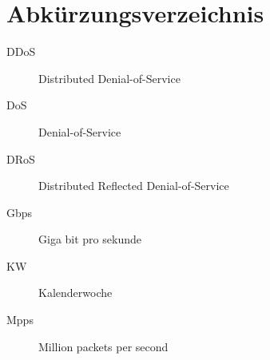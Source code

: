 \documentclass[../review_2.tex]{subfiles}
\begin{document}
\chapter{Abkürzungsverzeichnis}\thispagestyle{fancy}
\begin{description}
    \item[DDoS] Distributed Denial-of-Service
    \item[DoS] Denial-of-Service
    \item[DRoS] Distributed Reflected Denial-of-Service
    \item[Gbps] Giga bit pro sekunde
    \item[KW] Kalenderwoche
    \item[Mpps] Million packets per second
\end{description}
\end{document}
